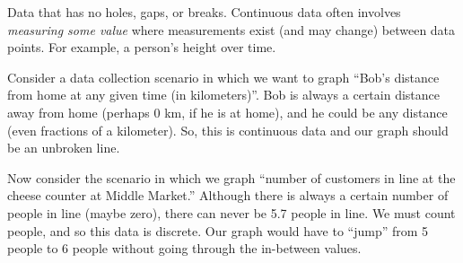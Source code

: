 \begin{boxdef}
Data that has no holes, gaps, or breaks. Continuous data often involves \textit{measuring some value} where measurements exist (and may change) between data points. For example, a person's height over time.
\end{boxdef}




Consider a data collection scenario in which we want to graph ``Bob's distance from home at any given time (in kilometers)''. Bob is always a certain distance away from home (perhaps 0 km, if he is at home), and he could be any distance (even fractions of a kilometer). So, this is continuous data and our graph should be an unbroken line.

Now consider the scenario in which we graph ``number of customers in line at the cheese counter at Middle Market.'' Although there is always a certain number of people in line (maybe zero), there can never be 5.7 people in line. We must count people, and so this data is discrete. Our graph would have to ``jump'' from 5 people to 6 people without going through the in-between values.


